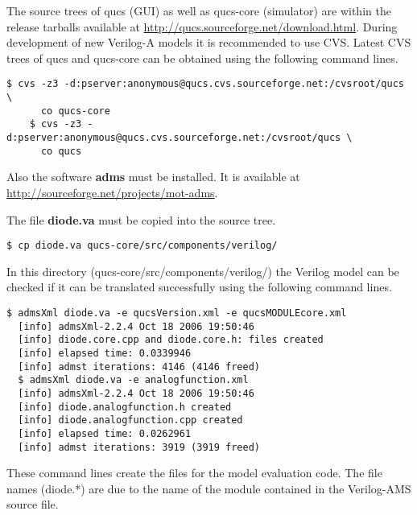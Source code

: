 The source trees of qucs (GUI) as well as qucs-core (simulator) are
within the release tarballs available at
\url{http://qucs.sourceforge.net/download.html}.  During development
of new Verilog-A models it is recommended to use CVS.  Latest CVS
trees of qucs and qucs-core can be obtained using the following
command lines.
\begin{Verbatim}[fontsize=\small]
    $ cvs -z3 -d:pserver:anonymous@qucs.cvs.sourceforge.net:/cvsroot/qucs \
      co qucs-core
    $ cvs -z3 -d:pserver:anonymous@qucs.cvs.sourceforge.net:/cvsroot/qucs \
      co qucs
\end{Verbatim}

Also the software \textbf{adms} must be installed.  It is available at
\url{http://sourceforge.net/projects/mot-adms}.

\addvspace{12pt}

The file \textbf{diode.va} must be copied into the source tree.
\begin{Verbatim}[fontsize=\small]
  $ cp diode.va qucs-core/src/components/verilog/
\end{Verbatim}

In this directory (qucs-core/src/components/verilog/) the Verilog
model can be checked if it can be translated successfully using the
following command lines.
\begin{Verbatim}[fontsize=\small]
  $ admsXml diode.va -e qucsVersion.xml -e qucsMODULEcore.xml
  [info] admsXml-2.2.4 Oct 18 2006 19:50:46
  [info] diode.core.cpp and diode.core.h: files created
  [info] elapsed time: 0.0339946
  [info] admst iterations: 4146 (4146 freed)
  $ admsXml diode.va -e analogfunction.xml
  [info] admsXml-2.2.4 Oct 18 2006 19:50:46
  [info] diode.analogfunction.h created
  [info] diode.analogfunction.cpp created
  [info] elapsed time: 0.0262961
  [info] admst iterations: 3919 (3919 freed)
\end{Verbatim}

These command lines create the files for the model evaluation code.
The file names (diode.*) are due to the name of the module contained
in the Verilog-AMS source file.

\addvspace{12pt}

